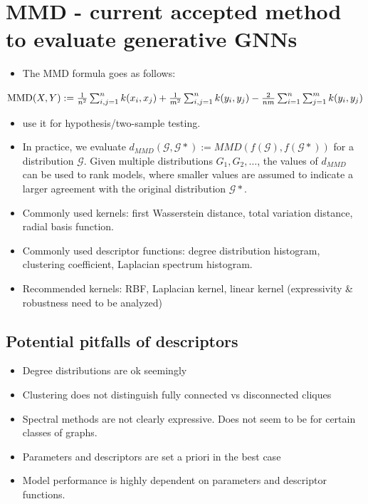 \documentclass[12pt]{article}
\begin{document}
\section{MMD - current accepted method to evaluate generative GNNs}
\label{sec:orga066285}
\begin{itemize}
\item The MMD formula goes as follows:
\end{itemize}
\(\text{MMD}(X, Y) := {1\over n^2} \sum_{i,j=1}^{n}k(x_i, x_j) + {1\over m^2} \sum_{i,j=1}^{n}k(y_i, y_j) - {2\over nm} \sum_{i=1}^{n}\sum_{j=1}^{m}k(y_i, y_j)\)
\begin{itemize}
\item use it for hypothesis/two-sample testing.
\item In practice, we evaluate \(d_{MMD}(\mathcal{G},\mathcal{G*}) :=
  MMD(f(\mathcal{G}),f(\mathcal{G}*))\) for a distribution \(\mathcal{G}\). Given
multiple distributions \(G_1, G_2, \hdots\), the values of \(d_{MMD}\) can be used
to rank models, where smaller values are assumed to indicate a larger
agreement with the original distribution \(\mathcal{G}*\).
\item Commonly used kernels: first Wasserstein distance, total variation distance,
radial basis function.
\item Commonly used descriptor functions: degree distribution histogram, clustering
coefficient, Laplacian spectrum histogram.
\item Recommended kernels: RBF, Laplacian kernel, linear kernel (expressivity \& robustness need to be analyzed)
\end{itemize}
\subsection{Potential pitfalls of descriptors}
\label{sec:orgc5a0e7b}
\begin{itemize}
\item Degree distributions are ok seemingly
\item Clustering does not distinguish fully connected vs disconnected cliques
\item Spectral methods are not clearly expressive. Does not seem to be for certain classes of graphs.
\item Parameters and descriptors are set a priori in the best case
\item Model performance is highly dependent on parameters and descriptor functions.
\end{itemize}
\end{document}

